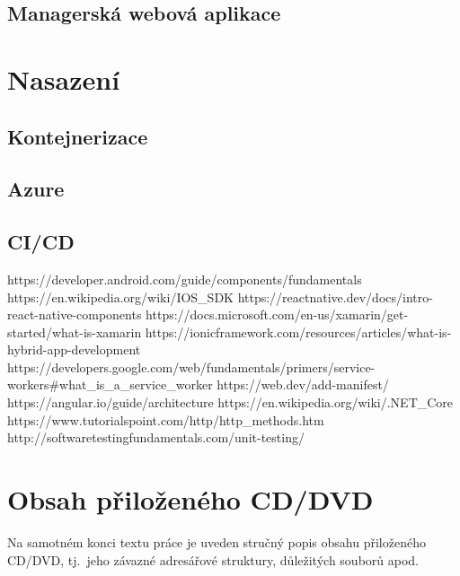 \documentclass[
  biblatex,
  glossaries,
  index
]{kidiplom}
\begin{document}
\subsection{Managerská webová aplikace}

\newpage

\section{Nasazení}

\subsection{Kontejnerizace}

\subsection{Azure}

\subsection{CI/CD}

\newpage


\begin{thebibliography}{9}
  https://developer.android.com/guide/components/fundamentals
  https://en.wikipedia.org/wiki/IOS_SDK
  https://reactnative.dev/docs/intro-react-native-components
  https://docs.microsoft.com/en-us/xamarin/get-started/what-is-xamarin
  https://ionicframework.com/resources/articles/what-is-hybrid-app-development
  https://developers.google.com/web/fundamentals/primers/service-workers#what_is_a_service_worker 
   https://web.dev/add-manifest/
  https://angular.io/guide/architecture
   https://en.wikipedia.org/wiki/.NET_Core
   https://www.tutorialspoint.com/http/http_methods.htm
   http://softwaretestingfundamentals.com/unit-testing/
 \end{thebibliography}


\newpage
\section{Obsah přiloženého CD/DVD} \label{sec:ObsahCD}

Na samotném konci textu práce je uveden stručný popis obsahu
přiloženého CD/DVD, tj.~jeho závazné adresářové struktury, důležitých
souborů apod.
\end{document}
